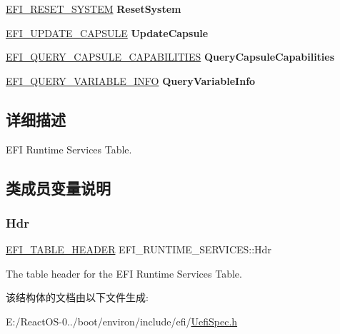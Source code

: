 \begin{DoxyCompactItemize}
\hyperlink{_uefi_spec_8h_acac49617ff412cb9a78840d6dd35f488}{E\+F\+I\+\_\+\+R\+E\+S\+E\+T\+\_\+\+S\+Y\+S\+T\+EM} {\bfseries Reset\+System}
\item 
\mbox{\label{struct_e_f_i___r_u_n_t_i_m_e___s_e_r_v_i_c_e_s_a2a49aab173682a45c1698f656cd93cd1}} 
\hyperlink{_uefi_spec_8h_a948c1bdf15293b20b5c3e4883572dfd2}{E\+F\+I\+\_\+\+U\+P\+D\+A\+T\+E\+\_\+\+C\+A\+P\+S\+U\+LE} {\bfseries Update\+Capsule}
\item 
\mbox{\label{struct_e_f_i___r_u_n_t_i_m_e___s_e_r_v_i_c_e_s_a13a77cd9fb6038af85c64bc597981b8d}} 
\hyperlink{_uefi_spec_8h_adbb2f2c2c6a036c59b743c5ee261a68a}{E\+F\+I\+\_\+\+Q\+U\+E\+R\+Y\+\_\+\+C\+A\+P\+S\+U\+L\+E\+\_\+\+C\+A\+P\+A\+B\+I\+L\+I\+T\+I\+ES} {\bfseries Query\+Capsule\+Capabilities}
\item 
\mbox{\label{struct_e_f_i___r_u_n_t_i_m_e___s_e_r_v_i_c_e_s_aa17a647383077cd5ac7bdf064a163afc}} 
\hyperlink{_uefi_spec_8h_a834867b2248041f6bd4de00ca2ea59fa}{E\+F\+I\+\_\+\+Q\+U\+E\+R\+Y\+\_\+\+V\+A\+R\+I\+A\+B\+L\+E\+\_\+\+I\+N\+FO} {\bfseries Query\+Variable\+Info}
\end{DoxyCompactItemize}


\subsection{详细描述}
E\+FI Runtime Services Table. 

\subsection{类成员变量说明}
\mbox{\label{struct_e_f_i___r_u_n_t_i_m_e___s_e_r_v_i_c_e_s_a25fb50638399044ec29eccc4e54cb29e}} 
\subsubsection{\texorpdfstring{Hdr}{Hdr}}
{\footnotesize\ttfamily \hyperlink{struct_e_f_i___t_a_b_l_e___h_e_a_d_e_r}{E\+F\+I\+\_\+\+T\+A\+B\+L\+E\+\_\+\+H\+E\+A\+D\+ER} E\+F\+I\+\_\+\+R\+U\+N\+T\+I\+M\+E\+\_\+\+S\+E\+R\+V\+I\+C\+E\+S\+::\+Hdr}

The table header for the E\+FI Runtime Services Table. 

该结构体的文档由以下文件生成\+:\begin{DoxyCompactItemize}
\item 
E\+:/\+React\+O\+S-\/0../boot/environ/include/efi/\hyperlink{_uefi_spec_8h}{Uefi\+Spec.\+h}\end{DoxyCompactItemize}
